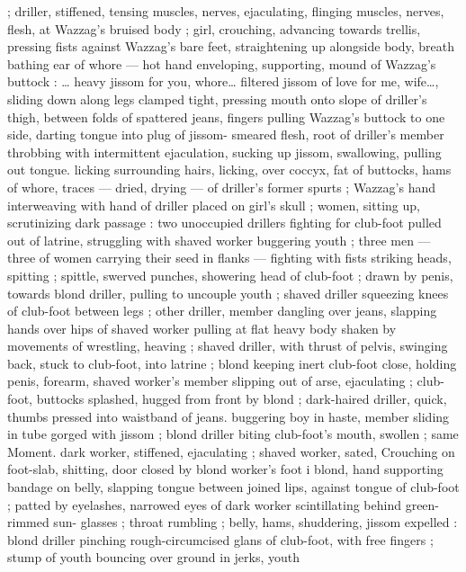 ; driller, stiffened, tensing muscles, nerves, ejaculating, flinging 
muscles, nerves, flesh, at Wazzag's bruised body ; girl, crouching, 
advancing towards trellis, pressing fists against Wazzag's bare feet, 
straightening up alongside body, breath bathing ear of whore --- hot 
hand enveloping, supporting, mound of Wazzag's buttock : {\gl}{\ldots} heavy 
jissom for you, whore{\ldots} filtered jissom of love for me, wife{\ldots}{\gr}, sliding 
down along legs clamped tight, pressing mouth onto slope of 
driller's thigh, between folds of spattered jeans, fingers pulling 
Wazzag's buttock to one side, darting tongue into plug of jissom- 
smeared flesh, root of driller's member throbbing with intermittent 
ejaculation, sucking up jissom, swallowing, pulling out tongue. licking 
surrounding hairs, licking, over coccyx, fat of buttocks, hams of 
whore, traces --- dried, drying --- of driller's former spurts ; 
Wazzag's hand interweaving with hand of driller placed on girl's skull 
; women, sitting up, scrutinizing dark passage : two unoccupied 
drillers fighting for club-foot pulled out of latrine, struggling with 
shaved worker buggering youth ; three men --- three of women 
carrying their seed in flanks --- fighting with fists striking heads, 
spitting ; spittle, swerved punches, showering head of club-foot ; 
drawn by penis, towards blond driller, pulling to uncouple youth ; 
shaved driller squeezing knees of club-foot between legs ; other 
driller, member dangling over jeans, slapping hands over hips of 
shaved worker pulling at flat heavy body shaken by movements of 
wrestling, heaving ; shaved driller, with thrust of pelvis, swinging 
back, stuck to club-foot, into latrine ; blond keeping inert club-foot 
close, holding penis, forearm, shaved worker's member slipping out 
of arse, ejaculating ; club-foot, buttocks splashed, hugged from front 
by blond ; dark-haired driller, quick, thumbs pressed into waistband 
of jeans. buggering boy in haste, member sliding in tube gorged with 
jissom ; blond driller biting club-foot's mouth, swollen ; same 
Moment. dark worker, stiffened, ejaculating ; shaved worker, sated, 
Crouching on foot-slab, shitting, door closed by blond worker's foot 
i blond, hand supporting bandage on belly, slapping tongue between 
joined lips, against tongue of club-foot ; patted by eyelashes, 
narrowed eyes of dark worker scintillating behind green-rimmed sun- 
glasses ; throat rumbling ; belly, hams, shuddering, jissom expelled : 
blond driller pinching rough-circumcised glans of club-foot, with free 
fingers ; stump of youth bouncing over ground in jerks, youth 
